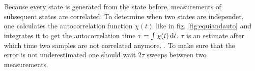     Because every state is generated from the state before, measurements
    of subsequent states are correlated. To determine when two states
    are independet, one calculates the autocorrelation function
    \(\chi(t)\) like in fig. \ref{fig:equiandauto}
    and integrates it to get the autocorrelation time \(\tau = \int \chi(t) \,\mathrm{d} t\).
    \(\tau\) is an estimate after which time two samples are not
    correlated anymore. \cite[S. ??]{NewmanBarkema1999} \cite[S. 150f]{Katzgraber2011}.
    To make sure that the error is not underestimated one should wait
    \(2\tau\) sweeps between two measurements.

